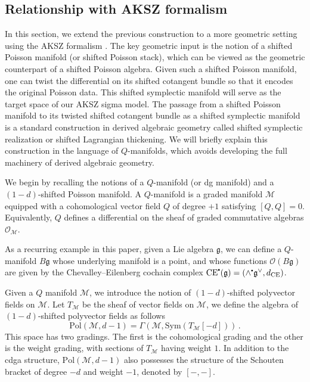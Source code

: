 \documentclass[11pt]{article}
\newcommand\sbullet[1][.5]{\mathbin{\vcenter{\hbox{\scalebox{#1}{$\bullet$}}}}}
\numberwithin{equation}{section}
\begin{document}
\subsection{Relationship with AKSZ formalism}
\label{sec:AKSZ}
In this section, we extend the previous construction to a more geometric setting using the AKSZ formalism \cite{Alexandrov:1995kv}. The key geometric input is the notion of a shifted Poisson manifold (or shifted Poisson stack), which can be viewed as the geometric counterpart of a shifted Poisson algebra. Given such a shifted Poisson manifold, one can twist the differential on its shifted cotangent bundle so that it encodes the original Poisson data. This shifted symplectic manifold will serve as the target space of our AKSZ sigma model. The passage from a shifted Poisson manifold to its twisted shifted cotangent bundle as a shifted symplectic manifold is a standard construction in derived algebraic geometry called shifted symplectic realization or shifted Lagrangian thickening. We will briefly explain this construction in the language of $Q$-manifolds, which avoids developing the full machinery of derived algebraic geometry.

We begin by recalling the notions of a $Q$-manifold (or dg manifold) and a $(1-d)$-shifted Poisson manifold. A $Q$-manifold is a graded manifold $\mathcal{M}$ equipped with a cohomological vector field $Q$ of degree $+1$ satisfying $[Q,Q]=0$. Equivalently, $Q$ defines a differential on the sheaf of graded commutative algebras $\mathcal{O}_{\mathcal{M}}$.

 As a recurring example in this paper, given a Lie algebra $\mathfrak{g}$, we can define a $Q$-manifold $B\mathfrak{g}$ whose underlying manifold is a point, and whose functions $\mathcal{O}(B\mathfrak{g})$ are given by the Chevalley--Eilenberg cochain complex $\mathrm{CE}^{\sbullet}(\mathfrak{g}) = (\wedge^{\sbullet}\mathfrak{g}^{\vee}, d_{\mathrm{CE}})$.
 
 
 Given a $Q$ manifold $\mathcal{M}$, we introduce the notion of $(1-d)$-shifted polyvector fields on $\mathcal{M}$. Let $T_{\mathcal{M}}$ be the sheaf of vector fields on $\mathcal{M}$, we define the algebra of $(1-d)$-shifted polyvector fields as follows
\begin{equation}
	\mathrm{Pol}(\mathcal{M},d-1) = \Gamma(\mathcal{M},\mathrm{Sym}(T_{\mathcal{M}}[-d]))\,.
\end{equation}
This space has two gradings. The first is the cohomological grading and the other is the weight grading, with sections of $T_{\mathcal{M}}$ having weight $1$. In addition to the cdga structure, $\mathrm{Pol}(\mathcal{M},d-1)$ also possesses the structure of the Schouten bracket of degree $-d$ and weight $-1$, denoted by $[-,-]$.
\end{document}

